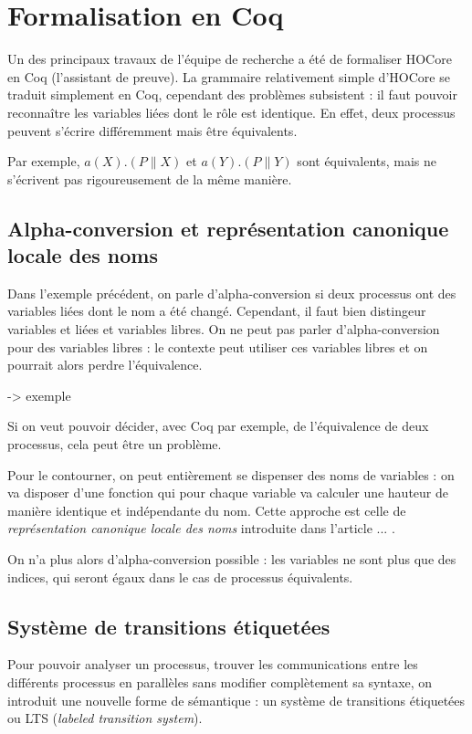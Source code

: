 \documentclass[11pt]{article}
\begin{document}

\section{Formalisation en Coq}
Un des principaux travaux de l'équipe de recherche a été de formaliser HOCore en Coq (l'assistant de preuve).
La grammaire relativement simple d'HOCore se traduit simplement en Coq, cependant des problèmes subsistent : il faut pouvoir reconnaître les variables liées dont le rôle est identique. En effet, deux processus peuvent s'écrire différemment mais être équivalents.

Par exemple, $a(X).(P\|X)$ et $a(Y).(P\|Y)$ sont équivalents, mais ne s'écrivent pas rigoureusement de la même manière.

\subsection{Alpha-conversion et représentation canonique locale des noms}
Dans l'exemple précédent, on parle d'alpha-conversion si deux processus ont des variables liées dont le nom a été changé. Cependant, il faut bien distingeur variables et liées et variables libres. On ne peut pas parler d'alpha-conversion pour des variables libres : le contexte peut utiliser ces variables libres et on pourrait alors perdre l'équivalence.

-> exemple

Si on veut pouvoir décider, avec Coq par exemple, de l'équivalence de deux processus, cela peut être un problème.

Pour le contourner, on peut entièrement se dispenser des noms de variables : on va disposer d'une fonction qui pour chaque variable va calculer une hauteur de manière identique et indépendante du nom. Cette approche est celle de \textit{représentation canonique locale des noms} introduite dans l'article ... .

On n'a plus alors d'alpha-conversion possible : les variables ne sont plus que des indices, qui seront égaux dans le cas de processus équivalents.



\subsection{Système de transitions étiquetées} %
Pour pouvoir analyser un processus, trouver les communications entre les différents processus en parallèles sans modifier complètement sa syntaxe, on introduit une nouvelle forme de sémantique : un système de transitions étiquetées ou LTS (\textit{labeled transition system}). 
\end{document}
